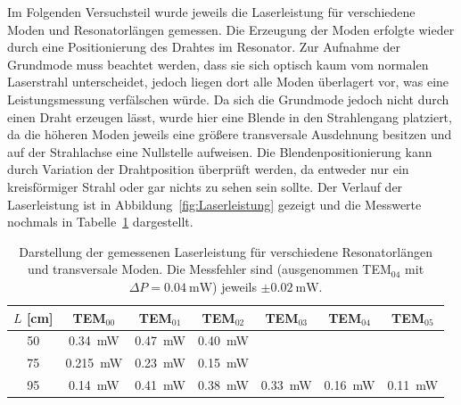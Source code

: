 \documentclass[a4paper,twoside,final]{article}
\begin{document}
Im Folgenden Versuchsteil wurde jeweils die Laserleistung für verschiedene Moden und Resonatorlängen gemessen. Die Erzeugung der Moden erfolgte wieder durch eine Positionierung des Drahtes im Resonator. Zur Aufnahme der Grundmode muss beachtet werden, dass sie sich optisch kaum vom normalen Laserstrahl unterscheidet, jedoch liegen dort alle Moden überlagert vor, was eine Leistungsmessung verfälschen würde. Da sich die Grundmode jedoch nicht durch einen Draht erzeugen lässt, wurde hier eine Blende in den Strahlengang platziert, da die höheren Moden jeweils eine größere transversale Ausdehnung besitzen und auf der Strahlachse eine Nullstelle aufweisen. Die Blendenpositionierung kann durch Variation der Drahtposition überprüft werden, da entweder nur ein kreisförmiger Strahl oder gar nichts zu sehen sein sollte. Der Verlauf der Laserleistung ist in Abbildung~\ref{fig:Laserleistung} gezeigt und die Messwerte nochmals in Tabelle~\ref{tab:Laserleistung} dargestellt.

\begin{table}[htp]
  \centering
  \caption{Darstellung der gemessenen Laserleistung für verschiedene Resonatorlängen und transversale Moden. Die Messfehler sind (ausgenommen TEM$_{04}$ mit $\Delta P =\SI{0.04}{\milli\watt}$) jeweils $\pm \SI{0.02}{\milli\watt}$.}
  \begin{tabular}{c c c c c c c }
    \toprule
    $L$ [\si{\centi\metre}] & TEM$_{00}$& TEM$_{01}$& TEM$_{02}$ & TEM$_{03}$& TEM$_{04}$& TEM$_{05}$ \\
    \midrule
    50 &\SI{0.34}{\milli\watt} & \SI{0.47}{\milli\watt} & \SI{0.40}{\milli\watt} & & &\\
    75 & \SI{0.215}{\milli\watt} & \SI{0.23}{\milli\watt} & \SI{0.15}{\milli\watt} & & &\\
    95 &\SI{0.14}{\milli\watt} & \SI{0.41}{\milli\watt} & \SI{0.38}{\milli\watt} & \SI{0.33}{\milli\watt} & \SI{0.16}{\milli\watt} & \SI{0.11}{\milli\watt}\\
    \bottomrule
  \end{tabular}
  \label{tab:Laserleistung}
\end{table}


\end{document}
